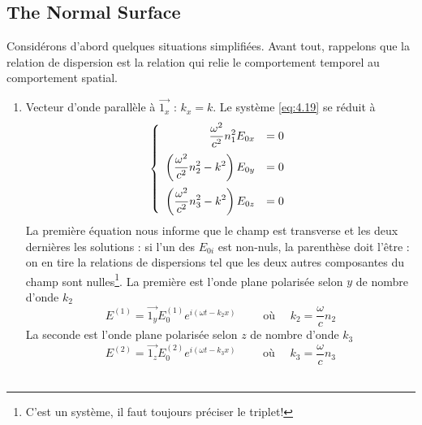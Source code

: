 \subsection{The Normal Surface}
Considérons d'abord quelques situations simplifiées. Avant tout, rappelons que la relation de dispersion
est la relation qui relie le comportement temporel au comportement spatial.
\begin{enumerate}
\item Vecteur d'onde parallèle à $\vec{1_x}$ : $k_x=k$. Le système \eqref{eq:4.19} se réduit à 
\begin{equation}
\left\{\begin{array}{rl}
\DS\frac{\omega^ 2}{c^2}n_1^2 E_{0x} &= 0\vspace{2mm}\\
\DS\left(\frac{\omega^2}{c^2}n_2^2-k^2\right)E_{0y}&=0\vspace{2mm}\\
\DS\left(\frac{\omega^2}{c^2}n_3^2-k^2\right)E_{0z}&=0
\end{array}\right.
\end{equation}
La première équation nous informe que le champ est transverse et les deux dernières les solutions : si l'un des $E_{0i}$ est non-nuls, la parenthèse doit l'être : on en tire la relations de dispersions tel que les deux 
autres composantes du champ sont nulles\footnote{C'est un système, il faut toujours préciser le triplet!}. La première est l'onde plane polarisée selon $y$ de nombre d'onde $k_2$
\begin{equation}
E^{(1)} = \vec{1_y}E_0^{(1)}e^{i(\omega t-k_2x)}\qquad\text{ où }\quad k_2 = \frac{\omega}{c}n_2
\end{equation}
La seconde est l'onde plane polarisée selon $z$ de nombre d'onde $k_3$
\begin{equation}
E^{(2)} = \vec{1_z}E_0^{(2)}e^{i(\omega t-k_3x)}\qquad\text{ où }\quad k_3 = \frac{\omega}{c}n_3
\end{equation}\ \\


\end{enumerate}
